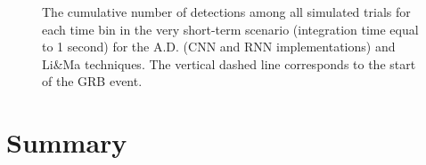 \begin{figure}[ht] %
\centering

\caption{The cumulative number of detections among all simulated trials for each time bin in the very short-term scenario (integration time equal to 1 second) for the A.D. (CNN and RNN implementations) and Li\&Ma techniques. The vertical dashed line corresponds to the start of the GRB event.}
\label{f:cumulative-detections-science-alert--itime-5}
\end{figure}







\section{Summary}
\label{s:Experiments-Summary}
